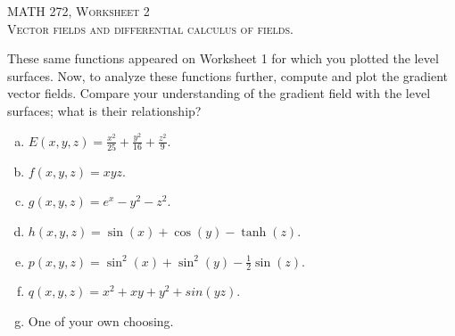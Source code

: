 \documentclass[12pt]{article} %
\begin{document}
\begin{center}
   \textsc{\large MATH 272, Worksheet 2}\\
   \textsc{Vector fields and differential calculus of fields.}
\end{center}
\vspace{.5cm}


\begin{problem}
These same functions appeared on Worksheet 1 for which you plotted the level surfaces. Now, to analyze these functions further, compute and plot the gradient vector fields. Compare your understanding of the gradient field with the level surfaces; what is their relationship?
\begin{multicols}{2}
\begin{enumerate}[(a)]
    \item $E(x,y,z) = \frac{x^2}{25} + \frac{y^2}{16} + \frac{z^2}{9}$.
    \item $f(x,y,z) = xyz$.
    \item $g(x,y,z) = e^x-y^2-z^2$.
    \item $h(x,y,z) = \sin(x)+\cos(y)-\tanh(z)$.
    \item $p(x,y,z) = \sin^2(x)+\sin^2(y)-\frac{1}{2}\sin(z)$.
    \item $q(x,y,z) = x^2+xy+y^2+sin(yz)$.
    \item One of your own choosing.
\end{enumerate}
\end{multicols}
\end{problem}
\end{document}
